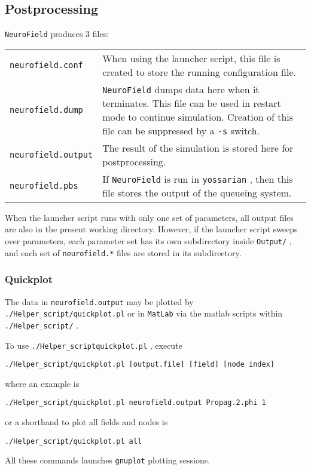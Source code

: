 \documentclass[12pt,a4paper]{article}
\newcommand{\type}[1]{ {\small\small\tt #1} }
\begin{document}
\subsection{Postprocessing}

\type{NeuroField} produces 3 files:

\begin{tabular}{l p{11.5cm}}
\type{neurofield.conf}& When using the launcher script, this file is created to store the running configuration file.\\
\type{neurofield.dump}& \type{NeuroField} dumps data here when it terminates. This file can be used in restart mode to continue simulation. Creation of this file can be suppressed by a \type{-s} switch.\\
\type{neurofield.output}& The result of the simulation is stored here for postprocessing.\\
\type{neurofield.pbs}& If \type{NeuroField} is run in \type{yossarian}, then this file stores the output of the queueing system.
\end{tabular}

When the launcher script runs with only one set of parameters, all output files are also in the present working directory. However, if the launcher script sweeps over parameters, each parameter set has its own subdirectory inside \type{Output/}, and each set of \type{neurofield.*} files are stored in its subdirectory.

\subsubsection{Quickplot}

The data in \type{neurofield.output} may be plotted by \type{./Helper\_script/quickplot.pl} or in \type{MatLab} via the matlab scripts within \type{./Helper\_script/}.

To use \type{./Helper\_script\/quickplot.pl}, execute
\begin{lstlisting}
./Helper_script/quickplot.pl [output.file] [field] [node index]
\end{lstlisting}
where an example is
\begin{lstlisting}
./Helper_script/quickplot.pl neurofield.output Propag.2.phi 1
\end{lstlisting}
or a shorthand to plot all fields and nodes is
\begin{lstlisting}
./Helper_script/quickplot.pl all
\end{lstlisting}
All these commands launches \type{gnuplot} plotting sessions.
\end{document}
